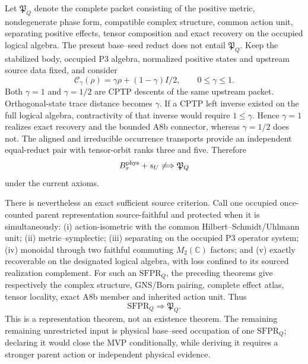 \documentclass[11pt]{article}
\begin{document}
Let $\mathfrak P_Q$ denote the complete packet consisting of the positive
metric, nondegenerate phase form, compatible complex structure, common action
unit, separating positive effects, tensor composition and exact recovery on
the occupied logical algebra. The present base--seed reduct does not entail
$\mathfrak P_Q$. Keep the stabilized body, occupied P3 algebra, normalized
positive states and upstream source data fixed, and consider
\begin{equation}
 \mathcal C_\gamma(\rho)
 =\gamma\rho+(1-\gamma)I/2,
 \qquad 0\leq\gamma\leq1.
 \label{eq:joint-packet-counterfamily}
\end{equation}
Both $\gamma=1$ and $\gamma=1/2$ are CPTP descents of the same upstream
packet. Orthogonal-state trace distance becomes $\gamma$. If a CPTP left
inverse existed on the full logical algebra, contractivity of that inverse
would require $1\leq\gamma$. Hence $\gamma=1$ realizes exact recovery and
the bounded A8b connector, whereas $\gamma=1/2$ does not. The aligned and
irreducible occurrence transports provide an independent equal-reduct pair
with tensor-orbit ranks three and five. Therefore
\begin{equation}
 B_\tau^{\rm phys}+s_U
 \not\Longrightarrow \mathfrak P_Q
 \label{eq:joint-packet-nonentailment}
\end{equation}
under the current axioms.

There is nevertheless an exact sufficient source criterion. Call one
occupied once-counted parent representation source-faithful and protected
when it is simultaneously: (i) action-isometric with the common
Hilbert--Schmidt/Uhlmann unit; (ii) metric--symplectic; (iii) separating on
the occupied P3 operator system; (iv) monoidal through two faithful commuting
$M_2(\mathbb C)$ factors; and (v) exactly recoverable on the designated
logical algebra, with loss confined to its sourced realization complement.
For such an $\mathrm{SFPR}_Q$, the preceding theorems give respectively the
complex structure, GNS/Born pairing, complete effect atlas, tensor locality,
exact A8b member and inherited action unit. Thus
\begin{equation}
 \mathrm{SFPR}_Q\Longrightarrow\mathfrak P_Q.
 \label{eq:sfpr-sufficient}
\end{equation}
This is a representation theorem, not an existence theorem. The remaining
remaining unrestricted input is physical base--seed occupation of one
$\mathrm{SFPR}_Q$; declaring it would close the MVP conditionally, while
deriving it requires a stronger parent action or independent physical
evidence.
\end{document}
